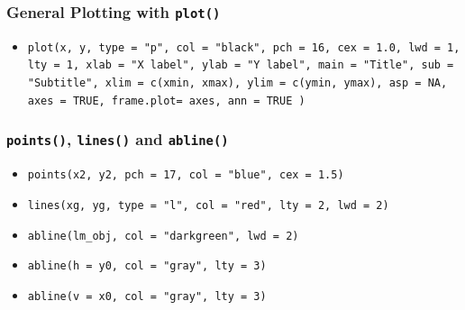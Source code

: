 \documentclass[11pt]{article}
\begin{document}
\begin{itemize}
\subsubsection*{General Plotting with \texttt{plot()}}
\begin{itemize}
  \item \texttt{plot(x, y,
        type      = "p",     %
        col       = "black", %
        pch       = 16,      %
        cex       = 1.0,     %
        lwd       = 1,       %
        lty       = 1,       %
        xlab      = "X label",
        ylab      = "Y label",
        main      = "Title",
        sub       = "Subtitle",
        xlim      = c(xmin, xmax),
        ylim      = c(ymin, ymax),
        asp       = NA,      %
        axes      = TRUE,    %
        frame.plot= axes,    %
        ann       = TRUE     %
      )}
\end{itemize}

\subsubsection*{\texttt{points()}, \texttt{lines()} and \texttt{abline()}}
\begin{itemize}
  \item \texttt{points(x2, y2,
        pch = 17,      %
        col = "blue",
        cex = 1.5)}    %

  \item \texttt{lines(xg, yg,
        type = "l",    %
        col  = "red",
        lty  = 2,      %
        lwd  = 2)}     %

  \item \texttt{abline(lm\_obj,
        col = "darkgreen",
        lwd = 2)}     %

  \item \texttt{abline(h = y0,      %
        col = "gray", lty = 3)}

  \item \texttt{abline(v = x0,      %
        col = "gray", lty = 3)}


\end{itemize}
\end{itemize}
\end{document}

